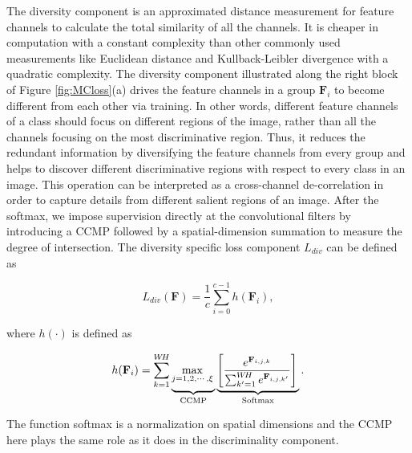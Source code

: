 \documentclass[journal]{IEEEtran}
\begin{document}
The diversity component is an approximated distance measurement for feature channels to calculate the total similarity of all the channels. It is cheaper in computation with a constant complexity than other commonly used measurements like Euclidean distance and Kullback-Leibler divergence with a quadratic complexity. The diversity component illustrated along the right block of Figure \ref{fig:MCloss}(a) drives the feature channels in a group $\mathbf{F}_i$ to become different from each other via training. In other words, different feature channels of a class should focus on different regions of the image, rather than all the channels focusing on the most discriminative region. Thus, it reduces the redundant information by diversifying the feature channels from  every group and helps to discover different discriminative regions with respect to every class in an image. This operation can be interpreted as a cross-channel de-correlation in order to capture details from different salient regions of an image. After the softmax, we impose supervision directly at the convolutional filters by introducing a CCMP followed by a spatial-dimension summation to measure the degree of intersection. The diversity specific loss component $L_{div}$ can be defined as

\begin{equation}
  {L}_{div}(\mathbf{F})=\frac{1}{c}\sum_{i=0}^{c-1}h(\mathbf{F}_i),
  \label{equ:ldiv}
\end{equation}

\noindent where $h(\cdot)$ is defined as 

\begin{equation}
  h(\mathbf{F}_i)=\sum_{k=1}^{W\!H} \underbrace{\max_{j=1,2,\cdots,\xi}\vphantom{\sum_{n=1}^{N}}}_{\text{CCMP}} \underbrace{\left[\frac{e^{\mathbf{F}_{i,j,k}}}{\sum_{k'=1}^{W\!H}e^{\mathbf{F}_{i,j,k'}}}\right]\vphantom{\sum_{n=1}^{N}}}_{\text{Softmax}}.
  \label{diver_loss}
\end{equation}

\noindent The function softmax is a normalization on spatial dimensions and the CCMP here plays the same role as it does in the discriminality component.
\end{document}
